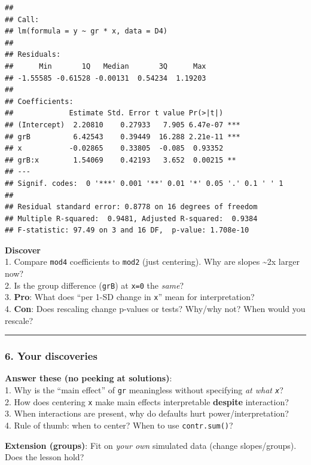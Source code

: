 \documentclass[
]{article}
\begin{document}
\begin{verbatim}
## 
## Call:
## lm(formula = y ~ gr * x, data = D4)
## 
## Residuals:
##      Min       1Q   Median       3Q      Max 
## -1.55585 -0.61528 -0.00131  0.54234  1.19203 
## 
## Coefficients:
##             Estimate Std. Error t value Pr(>|t|)    
## (Intercept)  2.20810    0.27933   7.905 6.47e-07 ***
## grB          6.42543    0.39449  16.288 2.21e-11 ***
## x           -0.02865    0.33805  -0.085  0.93352    
## grB:x        1.54069    0.42193   3.652  0.00215 ** 
## ---
## Signif. codes:  0 '***' 0.001 '**' 0.01 '*' 0.05 '.' 0.1 ' ' 1
## 
## Residual standard error: 0.8778 on 16 degrees of freedom
## Multiple R-squared:  0.9481, Adjusted R-squared:  0.9384 
## F-statistic: 97.49 on 3 and 16 DF,  p-value: 1.708e-10
\end{verbatim}

\textbf{Discover}\\
1. Compare \texttt{mod4} coefficients to \texttt{mod2} (just centering).
Why are slopes \textasciitilde2x larger now?\\
2. Is the group difference (\texttt{grB}) at \texttt{x=0} the
\emph{same}?\\
3. \textbf{Pro}: What does ``per 1-SD change in \texttt{x}'' mean for
interpretation?\\
4. \textbf{Con}: Does rescaling change p-values or tests? Why/why not?
When would you rescale?

\begin{center}\rule{0.5\linewidth}{0.5pt}\end{center}

\subsubsection{6. Your discoveries}\label{your-discoveries}

\textbf{Answer these (no peeking at solutions)}:\\
1. Why is the ``main effect'' of \texttt{gr} meaningless without
specifying \emph{at what \texttt{x}}?\\
2. How does centering \texttt{x} make main effects interpretable
\textbf{despite} interaction?\\
3. When interactions are present, why do defaults hurt
power/interpretation?\\
4. Rule of thumb: when to center? When to use \texttt{contr.sum()}?

\textbf{Extension (groups)}: Fit on \emph{your own} simulated data
(change slopes/groups). Does the lesson hold?
\end{document}
